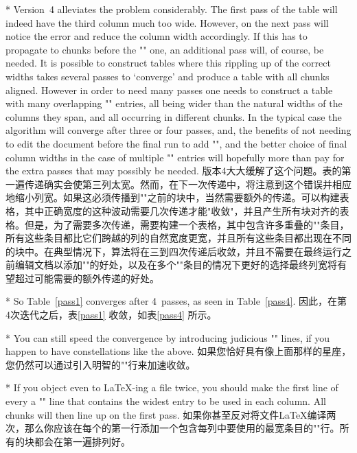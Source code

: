 \begin{paracol}{2}
\switchcolumn[0]*
Version~4 alleviates the problem considerably.
The first pass of the table will
indeed have the third column much too wide. However, on the next pass
 will notice the error and reduce the column width
accordingly. If this has to propagate to chunks before the
"\multicolumn" one, an additional pass will, of course, be
needed. It is possible to construct tables where this rippling up of
the correct widths takes several passes to `converge' and produce a
table with all chunks aligned. However in
order to need many passes one needs to construct a table with
many overlapping "\multicolumn" entries, all being wider than the
natural widths of the columns they span, and all occurring in
different chunks. In the typical case the algorithm will converge
after three or four passes, and, the benefits of not needing to edit
the document before the final run to add "\setlongtables", and the
better choice of final column widths in the case of multiple
"\multicolumn" entries  will hopefully more than pay for the extra
passes that may possibly be needed.
\switchcolumn
版本4大大缓解了这个问题。表的第一遍传递确实会使第三列太宽。然而，在下一次传递中，将注意到这个错误并相应地缩小列宽。如果这必须传播到"\multicolumn"之前的块中，当然需要额外的传递。可以构建表格，其中正确宽度的这种波动需要几次传递才能"收敛"，并且产生所有块对齐的表格。但是，为了需要多次传递，需要构建一个表格，其中包含许多重叠的"\multicolumn"条目，所有这些条目都比它们跨越的列的自然宽度更宽，并且所有这些条目都出现在不同的块中。在典型情况下，算法将在三到四次传递后收敛，并且不需要在最终运行之前编辑文档以添加"\setlongtables"的好处，以及在多个"\multicolumn"条目的情况下更好的选择最终列宽将有望超过可能需要的额外传递的好处。

\switchcolumn[0]*
So Table~\ref{pass1} converges after 4~passes, as seen in
Table~\ref{pass4}.
\switchcolumn  因此，在第4次迭代之后，表\ref{pass1} 收敛，如表\ref{pass4} 所示。

\switchcolumn[0]*
You can still speed the convergence by introducing judicious "\kill"
lines, if you happen to have constellations like the above.
\switchcolumn 如果您恰好具有像上面那样的星座，您仍然可以通过引入明智的"\kill"行来加速收敛。

\switchcolumn[0]*
If you object even to \LaTeX-ing a file twice, you should
make the first line of
every  a "\kill" line that contains the widest entry
to be used in each column. All chunks will then line up on the first
pass.
\switchcolumn
如果你甚至反对将文件\LaTeX 编译两次，那么你应该在每个的第一行添加一个包含每列中要使用的最宽条目的"\kill"行。所有的块都会在第一遍排列好。

\end{paracol}